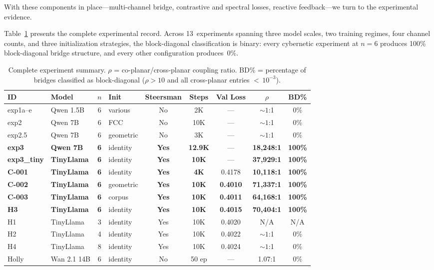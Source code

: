 \documentclass[11pt]{article}
\begin{document}
With these components in place---multi-channel bridge, contrastive and
spectral losses, reactive feedback---we turn to the experimental
evidence.

Table~\ref{tab:experiments} presents the complete experimental record.
Across 13~experiments spanning three model scales, two training
regimes, four channel counts, and three initialization strategies, the
block-diagonal classification is binary: every cybernetic experiment
at $n = 6$ produces 100\% block-diagonal bridge structure, and every
other configuration produces~0\%.

\begin{table}[H]
\centering
\caption{Complete experiment summary. $\rho$ = co-planar/cross-planar
  coupling ratio. BD\% = percentage of bridges classified as
  block-diagonal ($\rho > 10$ and all cross-planar entries
  ${<}\,10^{-3}$).}
\label{tab:experiments}
\small
\begin{tabular}{llclccccc}
\toprule
ID & Model & $n$ & Init & Steersman & Steps & Val Loss & $\rho$ & BD\% \\
\midrule
exp1a--e & Qwen 1.5B & 6 & various & No & 2K & --- & ${\sim}1$:1 & 0\% \\
exp2 & Qwen 7B & 6 & FCC & No & 10K & --- & ${\sim}1$:1 & 0\% \\
exp2.5 & Qwen 7B & 6 & geometric & No & 3K & --- & ${\sim}1$:1 & 0\% \\
\midrule
\textbf{exp3} & \textbf{Qwen 7B} & \textbf{6} & identity & \textbf{Yes} & \textbf{12.9K} & --- & \textbf{18{,}248:1} & \textbf{100\%} \\
\textbf{exp3\_tiny} & \textbf{TinyLlama} & \textbf{6} & identity & \textbf{Yes} & \textbf{10K} & --- & \textbf{37{,}929:1} & \textbf{100\%} \\
\textbf{C-001} & \textbf{TinyLlama} & \textbf{6} & identity & \textbf{Yes} & \textbf{4K} & 0.4178 & \textbf{10{,}118:1} & \textbf{100\%} \\
\textbf{C-002} & \textbf{TinyLlama} & \textbf{6} & geometric & \textbf{Yes} & \textbf{10K} & \textbf{0.4010} & \textbf{71{,}337:1} & \textbf{100\%} \\
\textbf{C-003} & \textbf{TinyLlama} & \textbf{6} & corpus & \textbf{Yes} & \textbf{10K} & \textbf{0.4011} & \textbf{64{,}168:1} & \textbf{100\%} \\
\textbf{H3} & \textbf{TinyLlama} & \textbf{6} & identity & \textbf{Yes} & \textbf{10K} & \textbf{0.4015} & \textbf{70{,}404:1} & \textbf{100\%} \\
\midrule
H1 & TinyLlama & 3 & identity & Yes & 10K & 0.4020 & N/A & N/A \\
H2 & TinyLlama & 4 & identity & Yes & 10K & 0.4022 & ${\sim}1$:1 & 0\% \\
H4 & TinyLlama & 8 & identity & Yes & 10K & 0.4024 & ${\sim}1$:1 & 0\% \\
\midrule
Holly & Wan 2.1 14B & 6 & identity & No & 50 ep & --- & 1.07:1 & 0\% \\
\bottomrule
\end{tabular}
\end{table}
\end{document}
